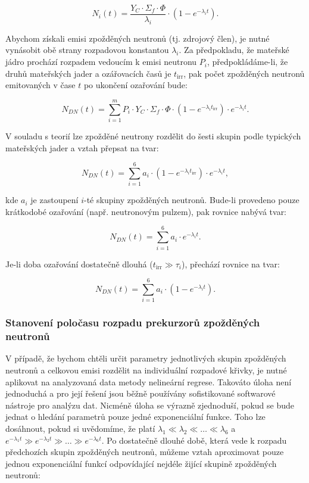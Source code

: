 \[
N_i(t) = \frac{Y_C \cdot \Sigma_f \cdot \Phi}{\lambda_i} \cdot \left(1 - e^{-\lambda_i t}\right).
\]

Abychom získali emisi zpožděných neutronů (tj. zdrojový člen), je nutné vynásobit obě strany rozpadovou konstantou $\lambda_i$. Za předpokladu, že mateřské jádro prochází rozpadem vedoucím k emisi neutronu $P_i$, předpokládáme-li, že druhů mateřských jader a ozářovacích časů je $t_\text{irr}$, pak počet zpožděných neutronů emitovaných v čase $t$ po ukončení ozařování bude:

\[
N_{DN}(t) = \sum_{i=1}^{m} P_i \cdot Y_C \cdot \Sigma_f \cdot \Phi \cdot (1 - e^{-\lambda_i t_\text{irr}}) \cdot e^{-\lambda_i t}.
\]

V souladu s teorií lze zpožděné neutrony rozdělit do šesti skupin podle typických mateřských jader a vztah přepsat na tvar:

\[
N_{DN}(t) = \sum_{i=1}^{6} a_i \cdot (1 - e^{-\lambda_i t_\text{irr}}) \cdot e^{-\lambda_i t},
\]

kde $a_i$ je zastoupení $i$-té skupiny zpožděných neutronů. Bude-li provedeno pouze krátkodobé ozařování (např. neutronovým pulzem), pak rovnice nabývá tvar:

\begin{equation}
    \boxed{N_{DN}(t) = \sum_{i=1}^{6} a_i \cdot e^{-\lambda_i t}.}
\end{equation}

Je-li doba ozařování dostatečně dlouhá ($t_\text{irr} \gg \tau_i$), přechází rovnice na tvar:

\begin{equation}
    \boxed{N_{DN}(t) = \sum_{i=1}^{6} a_i \cdot (1 - e^{-\lambda_i t}).}
\end{equation}

\subsubsection{Stanovení poločasu rozpadu prekurzorů zpožděných neutronů}

V případě, že bychom chtěli určit parametry jednotlivých skupin zpožděných neutronů a celkovou emisi rozdělit na individuální rozpadové křivky, je nutné aplikovat na analyzovaná data metody nelineární regrese. Takováto úloha není jednoduchá a pro její řešení jsou běžně používány sofistikované softwarové nástroje pro analýzu dat. Nicméně úloha se výrazně zjednoduší, pokud se bude jednat o hledání parametrů pouze jedné exponenciální funkce. Toho lze dosáhnout, pokud si uvědomíme, že platí $\lambda_1 \ll \lambda_2 \ll \dots \ll \lambda_6$ a $e^{-\lambda_1 t} \gg e^{-\lambda_2 t} \gg \dots \gg e^{-\lambda_6 t}$. Po dostatečně dlouhé době, která vede k rozpadu předchozích skupin zpožděných neutronů, můžeme vztah aproximovat pouze jednou exponenciální funkcí odpovídající nejdéle žijící skupině zpožděných neutronů:

